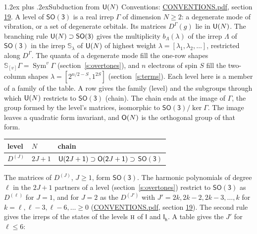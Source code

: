 \documentclass[10pt,a4paper]{article}
\makeatletter
\renewcommand\section{\@startsection{section}{1}{\z@}{-3ex plus -1ex minus -.2ex}%
  {1.2ex plus .2ex}{\normalfont\large\sffamily\bfseries\color{parttitle}}}
\numberwithin{equation}{section}
\newcommand{\grp}[1]{\mathsf{#1}}
\newcommand{\irr}[1]{\text{\normalfont\scshape #1}}
\newcommand{\irrJ}[1]{D^{(#1)}}
\newcommand{\repD}[1]{D^{#1}}
\newcommand{\schur}[1]{\mathbb{S}_{#1}}
\newcommand{\shape}[1]{[#1]}
\makeatother
\begin{document}
\section{Subduction from \texorpdfstring{$\grp{U(\mathnormal{N})}$}{U(N)}}\label{s:unitary}
Conventions: \href{../../CONVENTIONS.pdf}{CONVENTIONS.pdf}, section \href{../../CONVENTIONS.pdf\#conv.19}{19}.
\leavevmode\label{n:local.level.dimension}A level of $\grp{SO(3)}$ is a real irrep $\Gamma$ of dimension $N \ge 2$: a degenerate mode of vibration, or a set of degenerate orbitals. \label{n:group.unitary}Its matrices $\repD{\Gamma}(g)$ lie in $\grp{U(\mathnormal{N})}$. \label{n:irrep.schur}\label{n:shape.partition}\label{n:local.partition}\label{n:function.multiplicity.unitary}The branching rule $\grp{U(\mathnormal{N})} \supset \grp{SO(3)}$ gives the multiplicity $b_\Lambda(\lambda)$ of the irrep $\Lambda$ of $\grp{SO(3)}$ in the irrep $\schur{\lambda}$ of $\grp{U(\mathnormal{N})}$ of highest weight $\lambda = \shape{\lambda_1, \lambda_2, \dots}$, restricted along $\repD{\Gamma}$. \label{n:local.partition.power}\label{n:local.electrons}\label{n:local.spin}The quanta of a degenerate mode fill the one-row shapes $\schur{\shape{v}}\Gamma = \operatorname{Sym}^{v}\Gamma$ (section~\ref{s:overtones}), and $n$ electrons of spin $S$ fill the two-column shapes $\lambda = \shape{2^{n/2-S}, 1^{2S}}$ (section~\ref{s:terms}).
Each level here is a member of a family of the table. \label{n:head.level}\label{n:head.chain}A row gives the family (level) and the subgroups through which $\grp{U(\mathnormal{N})}$ restricts to $\grp{SO(3)}$ (chain). The chain ends at the image of $\Gamma$, the group formed by the level's matrices, isomorphic to $\grp{SO(3)}/\ker\Gamma$. The image leaves a quadratic form invariant, and $\grp{O(\mathnormal{N})}$ is the orthogonal group of that form.
{\small\begin{longtable}{@{}lll@{}}\toprule
level & $N$ & chain\\\midrule\endhead
\bottomrule\endfoot\endlastfoot
$\irrJ{J}$ & $2J+1$ & $\grp{U(2\mathnormal{J}+1)} \supset \grp{O(2\mathnormal{J}+1)} \supset$ $\grp{SO(3)}$\\
\bottomrule\end{longtable}}
The matrices of $\irrJ{J}$, $J \ge 1$, form $\grp{SO(3)}$. \label{n:index.harmonic.degree}\label{n:index.constituent}The harmonic polynomials of degree $\ell$ in the $2J + 1$ partners of a level (section~\ref{s:overtones}) restrict to $\grp{SO(3)}$ as $\irrJ{\ell}$ for $J = 1$, and for $J = 2$ as the $\irrJ{J'}$ with $J' = 2k, 2k - 2, 2k - 3, \dots, k$ for $k = \ell, \ell - 3, \ell - 6, \dots \ge 0$ (\href{../../CONVENTIONS.pdf}{CONVENTIONS.pdf}, section \href{../../CONVENTIONS.pdf\#conv.19}{19}). The second rule gives the irreps of the states of the levels $\irr{h}$ of \href{I.pdf}{$\grp{I}$} and \href{Ih.pdf}{$\grp{I_{h}}$}. A table gives the $J'$ for $\ell \le 6$:
\end{document}

